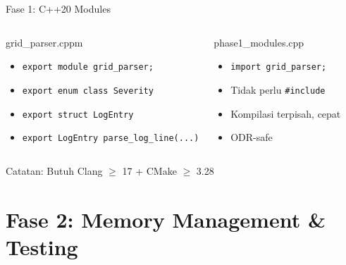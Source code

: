 \documentclass[aspectratio=169,10pt]{beamer}
\begin{document}
\begin{frame}{Fase 1: C++20 Modules}
  \begin{columns}[T]
    \begin{block}{grid\_parser.cppm}
      \begin{itemize}
        \item \texttt{export module grid\_parser;}
        \item \texttt{export enum class Severity}
        \item \texttt{export struct LogEntry}
        \item \texttt{export LogEntry parse\_log\_line(...)}
      \end{itemize}
    \end{block}
    \begin{block}{phase1\_modules.cpp}
      \begin{itemize}
        \item \texttt{import grid\_parser;}
        \item Tidak perlu \texttt{\#include}
        \item Kompilasi terpisah, cepat
        \item ODR-safe
      \end{itemize}
    \end{block}
  \end{columns}
  
  \vspace{0.5cm}
  \begin{alertblock}{Catatan: Butuh Clang $\ge$ 17 + CMake $\ge$ 3.28}
  \end{alertblock}
\end{frame}

\section{Fase 2: Memory Management \& Testing}
\end{document}

